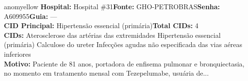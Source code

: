 \documentclass[a4paper,10pt]{article}
\begin{document}
\begin{anomalycard}[Interna\c{c}\~{a}o \#168097 | Pac. \#8378 | MODERADO (z=2.40) | LOS: 14d | 09/03/2026\,$\to$\,—]{anomyellow}
\textbf{Hospital:} Hospital \#31\quad \textbf{Fonte:} GHO-PETROBRAS\quad \textbf{Senha:} A609955\quad \textbf{Guia:} ---\\

\textbf{CID Principal:} {\small Hipertensão essencial (primária)}\quad\textbf{Total CIDs:} 4\\

\textbf{CIDs:} {\scriptsize Aterosclerose das artérias das extremidades \textbar{} Hipertensão essencial (primária) \textbar{} Calculose do ureter \textbar{} Infecções agudas não especificada das vias aéreas inferiores}\\

\textbf{Motivo:} {\scriptsize Paciente de 81 anos, portadora de enfisema pulmonar e bronquiectasia, no momento em tratamento mensal com Tezepelumabe, usuária de...}\\




\end{anomalycard}
\end{document}

